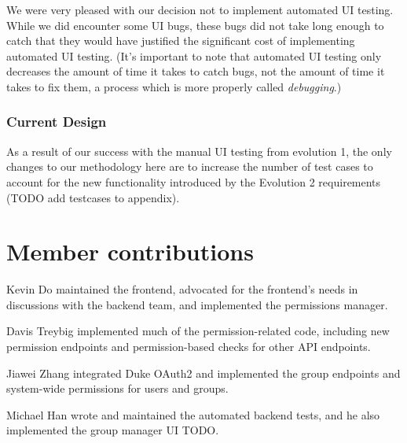 \documentclass[12pt]{article}
\begin{document}
We were very pleased with our decision not to implement automated UI testing. While we did encounter some UI bugs, these bugs did not take long enough to catch that they would have justified the significant cost of implementing automated UI testing. (It's important to note that automated UI testing only decreases the amount of time it takes to catch bugs, not the amount of time it takes to fix them, a process which is more properly called \emph{debugging}.)

\subsubsection{Current Design}
As a result of our success with the manual UI testing from evolution 1, the only changes to our methodology here are to increase the number of test cases to account for the new functionality introduced by the Evolution 2 requirements (TODO add testcases to appendix).

\section{Member contributions}
Kevin Do maintained the frontend, advocated for the frontend's needs in discussions with the backend team, and implemented the permissions manager.

Davis Treybig implemented much of the permission-related code, including new permission endpoints and permission-based checks for other API endpoints. 

Jiawei Zhang integrated Duke OAuth2 and implemented the group endpoints and system-wide permissions for users and groups.

Michael Han wrote and maintained the automated backend tests, and he also implemented the group manager UI TODO.

\clearpage
\appendix
\end{document}
